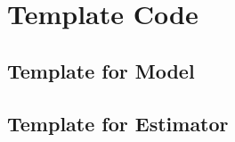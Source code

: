 \chapter{Template Code}\label{app:code}
\section{Template for Model}

\pagebreak
\section{Template for Estimator}

